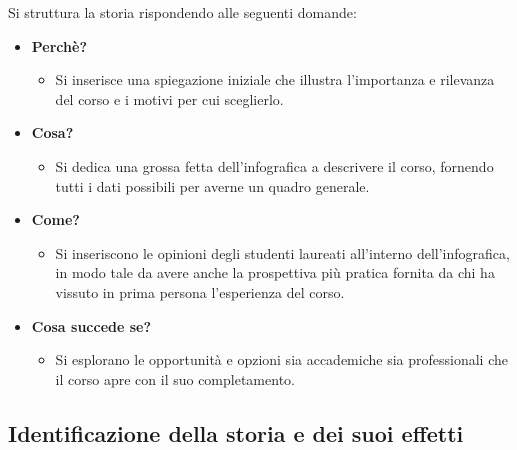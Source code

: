 \bigskip
\noindent Si struttura la storia rispondendo alle seguenti domande:
\begin{itemize}
    \item \textbf{Perchè?}
    \begin{itemize}
        \item Si inserisce una spiegazione iniziale che illustra l'importanza e rilevanza del corso e i motivi per cui sceglierlo.
    \end{itemize}
    \item \textbf{Cosa?}
    \begin{itemize}
        \item Si dedica una grossa fetta dell'infografica a descrivere il corso, fornendo tutti i dati possibili per averne un quadro generale.
    \end{itemize}
    \item \textbf{Come?}
    \begin{itemize}
        \item Si inseriscono le opinioni degli studenti laureati all'interno dell'infografica, in modo tale da avere anche la prospettiva più pratica fornita
        da chi ha vissuto in prima persona l'esperienza del corso.
    \end{itemize}
    \item \textbf{Cosa succede se?}
    \begin{itemize}
        \item Si esplorano le opportunità e opzioni sia accademiche sia professionali che il corso apre con il suo completamento.
    \end{itemize}
\end{itemize}


\subsection{Identificazione della storia e dei suoi effetti}
